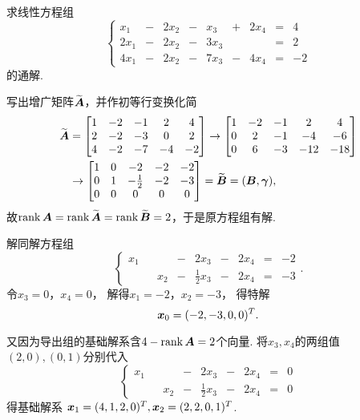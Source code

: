 \begin{example}
求线性方程组\begin{equation*}
	\left\{ \begin{array}{*{9}{r}}
		x_1 &-& 2 x_2 &-& x_3 &+& 2 x_4 &=& 4 \\
		2 x_1 &-& 2 x_2 &-& 3 x_3 && &=& 2 \\
		4 x_1 &-& 2 x_2 &-& 7 x_3 &-& 4 x_4 &=& -2
	\end{array} \right.
\end{equation*}的通解.
\begin{solution}
写出增广矩阵\(\widetilde{\boldsymbol{A}}\)，并作初等行变换化简
\begin{align*}
	\widetilde{\boldsymbol{A}}
	&= \begin{bmatrix}
		1 & -2 & -1 & 2 & 4 \\
		2 & -2 & -3 & 0 & 2 \\
		4 & -2 & -7 & -4 & -2
	\end{bmatrix}
	\to \begin{bmatrix}
		1 & -2 & -1 & 2 & 4 \\
		0 & 2 & -1 & -4 & -6 \\
		0 & 6 & -3 & -12 & -18
	\end{bmatrix} \\
	&\to \begin{bmatrix}
		1 & 0 & -2 & -2 & -2 \\
		0 & 1 & -\tfrac12 & -2 & -3 \\
		0 & 0 & 0 & 0 & 0
	\end{bmatrix}
	= \widetilde{\boldsymbol{B}}
	= (\boldsymbol{B},\boldsymbol\gamma),
\end{align*}
故\(\rank\boldsymbol{A} = \rank\widetilde{\boldsymbol{A}} = \rank\widetilde{\boldsymbol{B}} = 2\)，于是原方程组有解.

解同解方程组\begin{equation*}
	\left\{ \begin{array}{*{9}{c}}
		x_1 && &-& 2 x_3 &-& 2 x_4 &=& -2 \\
		&& x_2 &-& \frac12 x_3 &-& 2 x_4 &=& -3
	\end{array} \right..
\end{equation*}
令\(x_3 = 0\)，\(x_4 = 0\)，
解得\(x_1 = -2\)，\(x_2 = -3\)，
得特解\begin{equation*}
	\boldsymbol{x}_0 = (-2,-3,0,0)^T.
\end{equation*}

又因为导出组的基础解系含\(4 - \rank\boldsymbol{A} = 2\)个向量.
将\(x_3,x_4\)的两组值\((2,0),(0,1)\)分别代入\begin{equation*}
	\left\{ \begin{array}{*{9}{c}}
		x_1 && &-& 2 x_3 &-& 2 x_4 &=& 0 \\
		&& x_2 &-& \frac12 x_3 &-& 2 x_4 &=& 0
	\end{array} \right.
\end{equation*}
得基础解系
\(\boldsymbol{x}_1 = (4,1,2,0)^T,
\boldsymbol{x}_2 = (2,2,0,1)^T\).


\end{solution}
\end{example}
